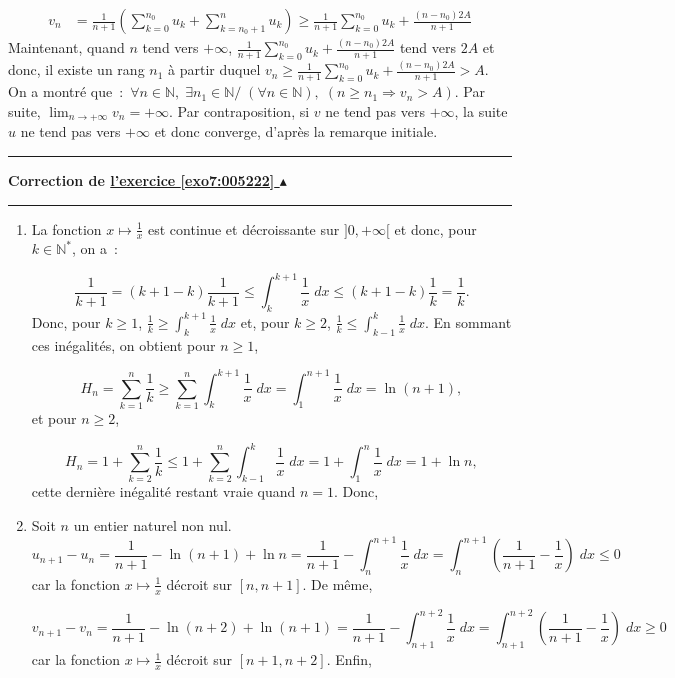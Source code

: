 \documentclass[11pt,a4paper]{article}
\newcommand{\Nn}{\mathbb{N}} \newcommand{\N}{\mathbb{N}}
\newcounter{exo}
\newcommand{\correction}[1]{\hypertarget{cor7:#1}{}\label{cor7:#1}{\bf Correction de \hyperlink{exo7:#1}{l'exercice \ref{exo7:#1} $\blacktriangle$}}\vspace{1mm}\hrule\vspace{1mm}}
\newcommand{\fincorrection}{\vspace{1mm}\hrule\vspace*{7mm}}
\begin{document}
\begin{align*}
v_n&=\frac{1}{n+1}\left(\sum_{k=0}^{n_0}u_k+\sum_{k=n_0+1}^{n}u_k\right)\geq \frac{1}{n+1}\sum_{k=0}^{n_0}u_k+\frac{(n-n_0)2A}{n+1}
\end{align*}
Maintenant, quand $n$ tend vers $+\infty$, $\frac{1}{n+1}\sum_{k=0}^{n_0}u_k+\frac{(n-n_0)2A}{n+1}$ tend vers $2A$ et donc, il existe un rang $n_1$ à partir duquel $v_n\geq\frac{1}{n+1}\sum_{k=0}^{n_0}u_k+\frac{(n-n_0)2A}{n+1}>A$.
On a montré que~:~$\forall n\in\Nn,\;\exists n_1\in\Nn/\;(\forall n\in\Nn),\;(n\geq n_1\Rightarrow v_n>A)$. Par suite, $\lim_{n\rightarrow +\infty}v_n=+\infty$. Par contraposition, si $v$ ne tend pas vers $+\infty$, la suite $u$ ne tend pas vers $+\infty$ et donc converge, d'après la remarque initiale.
\fincorrection
\correction{005222}
\begin{enumerate}
 \item  La fonction $x\mapsto\frac{1}{x}$ est continue et décroissante sur $]0,+\infty[$ et donc, pour $k\in\Nn^*$, on a~:
 
$$\frac{1}{k+1}=(k+1-k)\frac{1}{k+1}\leq\int_{k}^{k+1}\frac{1}{x}\;dx\leq(k+1-k)\frac{1}{k}=\frac{1}{k}.$$
Donc, pour $k\geq1$,  $\frac{1}{k}\geq\int_{k}^{k+1}\frac{1}{x}\;dx$ et, pour $k\geq2$, $\frac{1}{k}\leq\int_{k-1}^{k}\frac{1}{x}\;dx$.
En sommant ces inégalités, on obtient pour $n\geq1$,

$$H_n=\sum_{k=1}^{n}\frac{1}{k}\geq\sum_{k=1}^{n}\int_{k}^{k+1}\frac{1}{x}\;dx=\int_{1}^{n+1}\frac{1}{x}\;dx=\ln(n+1),$$ 
et pour $n\geq2$,

$$H_n=1+\sum_{k=2}^{n}\frac{1}{k}\leq1+\sum_{k=2}^{n}\int_{k-1}^{k}\frac{1}{x}\;dx=1+\int_{1}^{n}\frac{1}{x}\;dx=1+\ln n,$$
cette dernière inégalité restant vraie quand $n=1$. Donc,

\begin{center}
\shadowbox{
$\forall n\in\Nn^*,\;\ln(n+1)\leq H_n\leq1+\ln n.$
}
\end{center}
 \item  Soit $n$ un entier naturel non nul.
$$u_{n+1}-u_n=\frac{1}{n+1}-\ln(n+1)+\ln n=\frac{1}{n+1}-\int_{n}^{n+1}\frac{1}{x}\;dx=\int_{n}^{n+1}\left(\frac{1}{n+1}-\frac{1}{x}\right)\;dx\leq0$$
car la fonction $x\mapsto\frac{1}{x}$ décroit sur $[n,n+1]$. De même,

$$v_{n+1}-v_n=\frac{1}{n+1}-\ln(n+2)+\ln(n+1)=\frac{1}{n+1}-\int_{n+1}^{n+2}\frac{1}{x}\;dx=\int_{n+1}^{n+2}\left(\frac{1}{n+1}-\frac{1}{x}\right)\;dx\geq0$$
car la fonction $x\mapsto\frac{1}{x}$ décroit sur $[n+1,n+2]$. Enfin,


\end{enumerate}
\end{document}

